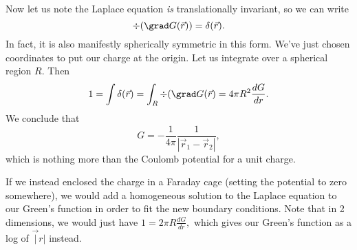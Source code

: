 Now let us note the Laplace equation \emph{is} translationally invariant, so we can write
\begin{equation}
    \div(\grad G (\vec r)) = \delta(\vec r).
\end{equation}
In fact, it is also manifestly spherically symmetric in this form. We've just chosen coordinates to put our charge at the origin. Let us integrate over a spherical region $R$. Then
\begin{equation}
    1= \int \delta(\vec r) = \int_R \div(\grad G(\vec r) = 4\pi R^2 \frac{dG}{dr}.
\end{equation}
We conclude that
\begin{equation}
    G = -\frac{1}{4\pi} \frac{1}{|\vec r_1-\vec r_2|},
\end{equation}
which is nothing more than the Coulomb potential for a unit charge.

If we instead enclosed the charge in a Faraday cage (setting the potential to zero somewhere), we would add a homogeneous solution to the Laplace equation to our Green's function in order to fit the new boundary conditions. Note that in 2 dimensions, we would just have $1=2\pi R \frac{dG}{dr},$ which gives our Green's function as a log of $\vec|r|$ instead.

